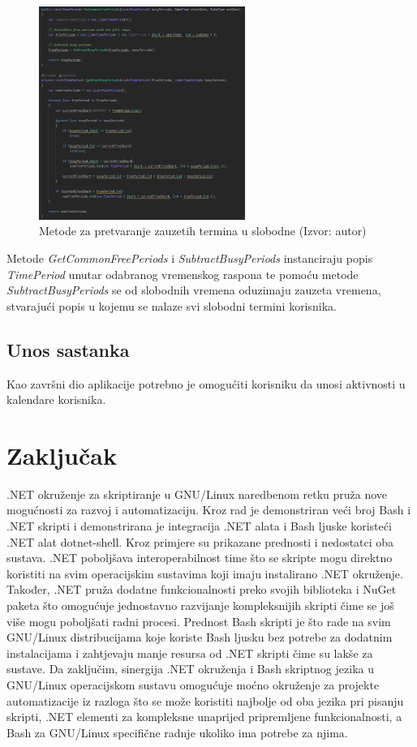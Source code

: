 \documentclass{foi}
\begin{document}
\begin{figure}[H]
    \centering
    \includegraphics[width=0.6\textwidth]{slike/FreePeriods.png}
    \caption{Metode za pretvaranje zauzetih termina u slobodne (Izvor: autor)}
    \label{fig:FreePeriods}
\end{figure}
Metode \textit{GetCommonFreePeriods} i \textit{SubtractBusyPeriods} instanciraju popis \textit{TimePeriod} unutar odabranog vremenskog raspona te pomoću metode \textit{SubtractBusyPeriods} se od slobodnih vremena oduzimaju zauzeta vremena, stvarajući popis u kojemu se nalaze svi slobodni termini korisnika.
\section{Unos sastanka}
Kao završni dio aplikacije potrebno je omogućiti korisniku da unosi aktivnosti u kalendare korisnika. 





\chapter{Zaključak}
.NET okruženje za skriptiranje u GNU/Linux naredbenom retku pruža nove mogućnosti za razvoj i automatizaciju. Kroz rad je demonstriran veći broj Bash i .NET skripti i demonstrirana je integracija .NET alata i Bash ljuske koristeći .NET alat dotnet-shell. Kroz primjere su prikazane prednosti i nedostatci oba sustava. .NET poboljšava interoperabilnost time što se skripte mogu direktno koristiti na svim operacijskim sustavima koji imaju instalirano .NET okruženje. Također, .NET pruža dodatne funkcionalnosti preko svojih biblioteka i NuGet paketa što omogućuje jednostavno razvijanje kompleksnijih skripti čime se još više mogu poboljšati radni procesi. Prednost Bash skripti je što rade na svim GNU/Linux distribucijama koje koriste Bash ljusku bez potrebe za dodatnim instalacijama i zahtjevaju manje resursa od .NET skripti čime su lakše za sustave. Da zaključim, sinergija .NET okruženja i Bash skriptnog jezika u GNU/Linux operacijskom sustavu omogućuje moćno okruženje za projekte automatizacije iz razloga što se može koristiti najbolje od oba jezika pri pisanju skripti, .NET elementi za kompleksne unaprijed pripremljene funkcionalnosti, a Bash za GNU/Linux specifične radnje ukoliko ima potrebe za njima. 

\printbibliography[title=Popis literature]

\listoffigures
{}
\end{document}

